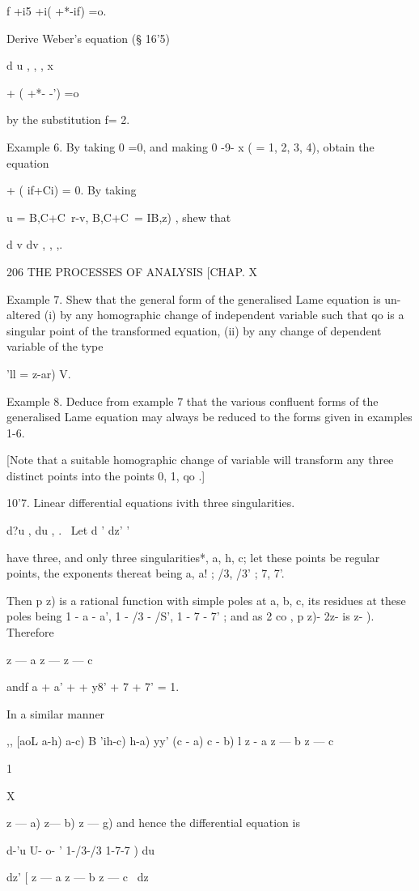 f +i5 +i( +*-if) =o.

Derive Weber's equation (§ 16'5)

d u , , , x

  + ( +*- -') =o

by the substitution f= 2.

Example 6. By taking 0 =0, and making 0 -9- x ( = 1, 2, 3, 4), obtain
the equation

  + ( if+Ci) = 0. By taking

u = B,C+C\ r-v, B,C+C\ = IB,z) , shew that

 d v dv , , ,.

206 THE PROCESSES OF ANALYSIS [CHAP. X

Example 7. Shew that the general form of the generalised Lame equation
is un- altered (i) by any homographic change of independent variable
such that qo is a singular point of the transformed equation, (ii) by
any change of dependent variable of the type

'll = z-ar) V.

Example 8. Deduce from example 7 that the various confluent forms of
the generalised Lame equation may always be reduced to the forms given
in examples 1-6.

[Note that a suitable homographic change of variable will transform
any three distinct points into the points 0, 1, qo .]

10'7. Linear differential equations ivith three singularities.

d?u , du , . \ Let d ' dz' '

have three, and only three singularities*, a, h, c; let these points
be regular points, the exponents thereat being a, a! ; /3, /3' ; 7,
7'.

Then p z) is a rational function with simple poles at a, b, c, its
residues at these poles being 1 - a - a', 1 - /3 - /S', 1 - 7 - 7' ;
and as 2 co , p z)- 2z- is z- ). Therefore

  z — a z — z — c

andf a + a' + + y8' + 7 + 7' = 1.

In a similar manner

,, [aoL a-h) a-c) B 'ih-c) h-a) yy' (c - a) c - b) l z - a z — b z — c

1

X

 z — a) z— b) z — g) and hence the differential equation is

d-'u U- o- ' 1-/3-/3 1-7-7 ) du

dz' [ z — a z — b z — c \ dz

